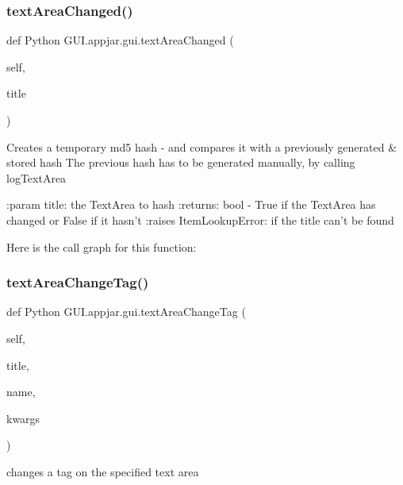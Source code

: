 \begin{DoxyVerb}
\subsubsection{\texorpdfstring{text\+Area\+Changed()}{textAreaChanged()}}
{\footnotesize\ttfamily def Python G\+U\+I.\+appjar.\+gui.\+text\+Area\+Changed (\begin{DoxyParamCaption}\item[{}]{self,  }\item[{}]{title }\end{DoxyParamCaption})}

\begin{DoxyVerb}Creates a temporary md5 hash - and compares it with a previously generated & stored hash
The previous hash has to be generated manually, by calling logTextArea

:param title: the TextArea to hash
:returns: bool - True if the TextArea has changed or False if it hasn't
:raises ItemLookupError: if the title can't be found
\end{DoxyVerb}
 Here is the call graph for this function\+:
\mbox{\label{class_python_01_g_u_i_1_1appjar_1_1gui_a02cdc692f2161afd6fd93ef9ec5d0282}} 
\subsubsection{\texorpdfstring{text\+Area\+Change\+Tag()}{textAreaChangeTag()}}
{\footnotesize\ttfamily def Python G\+U\+I.\+appjar.\+gui.\+text\+Area\+Change\+Tag (\begin{DoxyParamCaption}\item[{}]{self,  }\item[{}]{title,  }\item[{}]{name,  }\item[{}]{kwargs }\end{DoxyParamCaption})}

\begin{DoxyVerb}changes a tag on the specified text area \end{DoxyVerb}
 \mbox{\label{class_python_01_g_u_i_1_1appjar_1_1gui_abb0f4952e76c77dbf5ca2e7e10ffbfb9}} 

\end{DoxyVerb}
